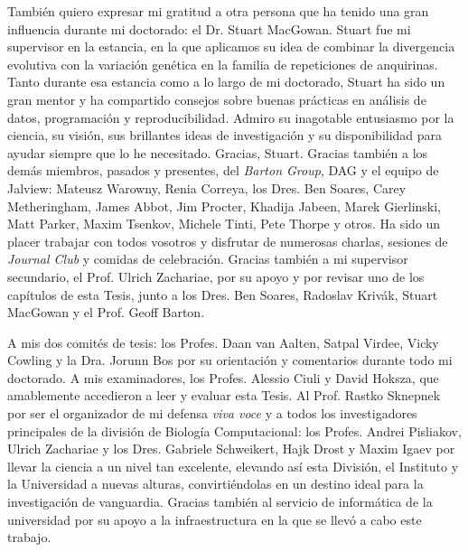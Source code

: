 También quiero expresar mi gratitud a otra persona que ha tenido una gran influencia durante mi doctorado: el Dr. Stuart MacGowan. Stuart fue mi supervisor en la estancia, en la que aplicamos su idea de combinar la divergencia evolutiva con la variación genética en la familia de repeticiones de anquirinas. Tanto durante esa estancia como a lo largo de mi doctorado, Stuart ha sido un gran mentor y ha compartido consejos sobre buenas prácticas en análisis de datos, programación y reproducibilidad. Admiro su inagotable entusiasmo por la ciencia, su visión, sus brillantes ideas de investigación y su disponibilidad para ayudar siempre que lo he necesitado. Gracias, Stuart. Gracias también a los demás miembros, pasados y presentes, del \textit{Barton Group}, DAG y el equipo de Jalview: Mateusz Warowny, Renia Correya, los Dres. Ben Soares, Carey Metheringham, James Abbot, Jim Procter, Khadija Jabeen, Marek Gierlinski, Matt Parker, Maxim Tsenkov, Michele Tinti, Pete Thorpe y otros. Ha sido un placer trabajar con todos vosotros y disfrutar de numerosas charlas, sesiones de \textit{Journal Club} y comidas de celebración. Gracias también a mi supervisor secundario, el Prof. Ulrich Zachariae, por su apoyo y por revisar uno de los capítulos de esta Tesis, junto a los Dres. Ben Soares, Radoslav Krivák, Stuart MacGowan y el Prof. Geoff Barton.

A mis dos comités de tesis: los Profes. Daan van Aalten, Satpal Virdee, Vicky Cowling y la Dra. Jorunn Bos por su orientación y comentarios durante todo mi doctorado. A mis examinadores, los Profes. Alessio Ciuli y David Hoksza, que amablemente accedieron a leer y evaluar esta Tesis. Al Prof. Rastko Sknepnek por ser el organizador de mi defensa \textit{viva voce} y a todos los investigadores principales de la división de Biología Computacional: los Profes. Andrei Pisliakov, Ulrich Zachariae y los Dres. Gabriele Schweikert, Hajk Drost y Maxim Igaev por llevar la ciencia a un nivel tan excelente, elevando así esta División, el Instituto y la Universidad a nuevas alturas, convirtiéndolas en un destino ideal para la investigación de vanguardia. Gracias también al servicio de informática de la universidad por su apoyo a la infraestructura en la que se llevó a cabo este trabajo.

